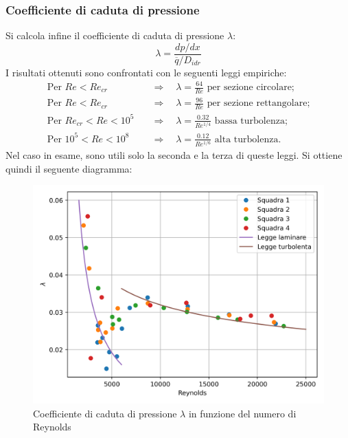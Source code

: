 \subsubsection{Coefficiente di caduta di pressione}
Si calcola infine il coefficiente di caduta di pressione $\lambda$:
\begin{equation*}
    \lambda = \frac{dp/dx}{\overline q/D_{idr}}
\end{equation*}
I risultati ottenuti sono confrontati con le seguenti leggi empiriche:
\begin{equation*}
    \begin{split}
        \text{Per } Re < Re_{cr} \quad &\Rightarrow \quad \lambda = \frac{64}{Re} \text{ per sezione circolare;}\\
        \text{Per } Re < Re_{cr} \quad &\Rightarrow \quad \lambda = \frac{96}{Re} \text{ per sezione rettangolare;}\\
        \text{Per } Re_{cr} < Re < 10^5 \quad &\Rightarrow \quad \lambda = \frac{0.32}{Re^{1/4}} \text{ bassa turbolenza;}\\
        \text{Per } 10^5 < Re < 10^8 \quad &\Rightarrow \quad \lambda = \frac{0.12}{Re^{1/6}} \text{ alta turbolenza.}
    \end{split}
\end{equation*}
Nel caso in esame, sono utili solo la seconda e la terza di queste leggi. Si ottiene quindi il seguente diagramma:
\begin{figure}[H]
    \centering
    \includegraphics[width=.92\textwidth]{images/7/lambda.png}
    \caption{Coefficiente di caduta di pressione $\lambda$ in funzione del numero di Reynolds}
\end{figure}

